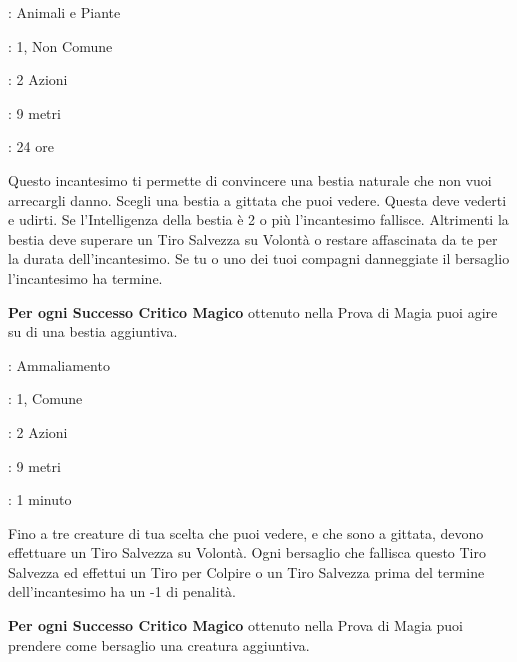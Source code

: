 \begin{multicols}{2}
\noindent\colorbox{OBSSgold!10}{
\begin{minipage}{0.95\linewidth}
\begin{description}[noitemsep, topsep=0pt, parsep=0pt, partopsep=0pt, leftmargin=0cm, labelwidth=1.3cm]
\item[\textbf{Lista}]: Animali e Piante
\item[\textbf{Livello}]: 1, Non Comune
\item[\textbf{Lancio}]: 2 Azioni
\item[\textbf{Gittata}]: 9 metri
\item[\textbf{Durata}]: 24 ore
\end{description}
\end{minipage}}\smallskip

Questo incantesimo ti permette di convincere una bestia naturale che non vuoi arrecargli danno. Scegli una bestia a gittata che puoi vedere. Questa deve vederti e udirti. Se l'Intelligenza della bestia è 2 o più l'incantesimo fallisce. Altrimenti la bestia deve superare un Tiro Salvezza su Volontà o restare affascinata da te per la durata dell'incantesimo. Se tu o uno dei tuoi compagni danneggiate il bersaglio l'incantesimo ha termine.

\textbf{Per ogni Successo Critico Magico} ottenuto nella Prova di Magia puoi agire su di una bestia aggiuntiva.

\noindent\colorbox{OBSSgold!10}{
\begin{minipage}{0.95\linewidth}
\begin{description}[noitemsep, topsep=0pt, parsep=0pt, partopsep=0pt, leftmargin=0cm, labelwidth=1.3cm]
\item[\textbf{Lista}]: Ammaliamento
\item[\textbf{Livello}]: 1, Comune
\item[\textbf{Lancio}]: 2 Azioni
\item[\textbf{Gittata}]: 9 metri
\item[\textbf{Durata}]: 1 minuto
\end{description}
\end{minipage}}\smallskip

Fino a tre creature di tua scelta che puoi vedere, e che sono a gittata, devono effettuare un Tiro Salvezza su Volontà. Ogni bersaglio che fallisca questo Tiro Salvezza ed effettui un Tiro per Colpire o un Tiro Salvezza prima del termine dell'incantesimo ha un -1 di penalità.

\textbf{Per ogni Successo Critico Magico} ottenuto nella Prova di Magia puoi prendere come bersaglio una creatura aggiuntiva.


\end{multicols}
